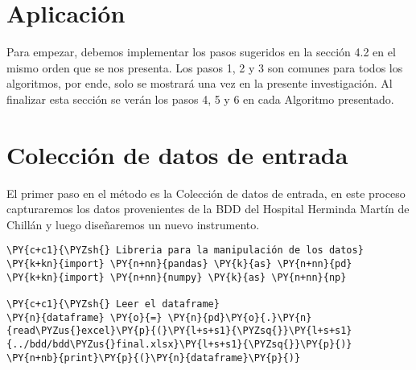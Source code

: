      \hypertarget{apliacaciuxf3n-del-muxe9todo}{%
\section{Aplicación}\label{apliacaciuxf3n-del-muxe9todo}}

Para empezar, debemos implementar los pasos sugeridos en la sección 4.2 en el mismo orden que se nos presenta. Los pasos 1, 2 y 3 son comunes para todos los algoritmos, por ende, solo se mostrará una vez en la presente investigación. Al finalizar esta sección se verán los pasos 4, 5 y 6 en cada Algoritmo presentado.

    \hypertarget{colecciuxf3n-de-datos-de-entrada}{%
\section{Colección de datos de
entrada}\label{colecciuxf3n-de-datos-de-entrada}}

El primer paso en el método es la Colección de datos de entrada, en este proceso capturaremos los datos provenientes de la BDD del Hospital Herminda Martín de Chillán y luego diseñaremos un nuevo instrumento.

    \begin{tcolorbox}[breakable, size=fbox, boxrule=1pt, pad at break*=1mm,colback=cellbackground, colframe=cellborder]
\begin{Verbatim}[commandchars=\\\{\}]
\PY{c+c1}{\PYZsh{} Libreria para la manipulación de los datos}
\PY{k+kn}{import} \PY{n+nn}{pandas} \PY{k}{as} \PY{n+nn}{pd}
\PY{k+kn}{import} \PY{n+nn}{numpy} \PY{k}{as} \PY{n+nn}{np}

\PY{c+c1}{\PYZsh{} Leer el dataframe}
\PY{n}{dataframe} \PY{o}{=} \PY{n}{pd}\PY{o}{.}\PY{n}{read\PYZus{}excel}\PY{p}{(}\PY{l+s+s1}{\PYZsq{}}\PY{l+s+s1}{../bdd/bdd\PYZus{}final.xlsx}\PY{l+s+s1}{\PYZsq{}}\PY{p}{)}
\PY{n+nb}{print}\PY{p}{(}\PY{n}{dataframe}\PY{p}{)}
\end{Verbatim}
\end{tcolorbox}

